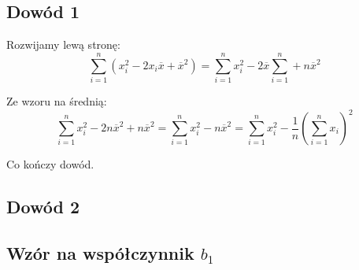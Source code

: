 \documentclass[11pt]{article}
\begin{document}
\pagebreak

\subsection{Dowód 1}
Rozwijamy lewą stronę:
\begin{equation}
  \sum_{i=1}^{n}(x_i^2 - 2x_i\overline{x} + \overline{x}^2) = \sum_{i=1}^{n} x_i^2 - 2\overline{x}\sum_{i=1}^{n} + n\overline{x}^2
\end{equation}

Ze wzoru na średnią:
\begin{equation}
  \sum_{i=1}^{n}x_i^2 - 2n\overline{x}^2 + n\overline{x}^2 = \sum_{i=1}^{n} x_i^2 - n\overline{x}^2
  = \sum_{i=1}^{n} x_i^2 - \frac{1}{n} (\sum_{i=1}^{n} x_i)^2
\end{equation}

Co kończy dowód.

\subsection{Dowód 2}

\subsection{Wzór na współczynnik $b_1$}
\end{document}

